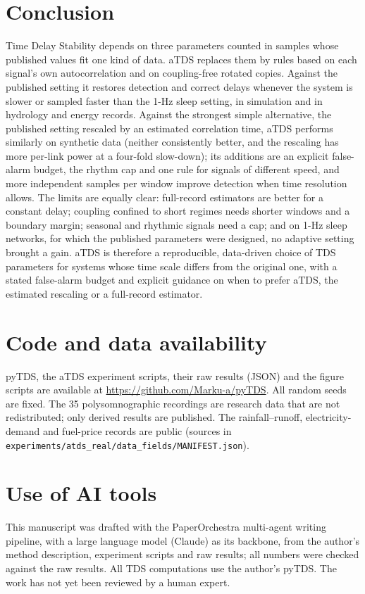 \documentclass[11pt,a4paper]{article}
\begin{document}
\section{Conclusion}
\label{sec:conclusion}
Time Delay Stability depends on three parameters counted in samples whose published values fit one kind of data. aTDS replaces them by rules based on each signal's own autocorrelation and on coupling-free rotated copies. Against the published setting it restores detection and correct delays whenever the system is slower or sampled faster than the 1-Hz sleep setting, in simulation and in hydrology and energy records. Against the strongest simple alternative, the published setting rescaled by an estimated correlation time, aTDS performs similarly on synthetic data (neither consistently better, and the rescaling has more per-link power at a four-fold slow-down); its additions are an explicit false-alarm budget, the rhythm cap and one rule for signals of different speed, and more independent samples per window improve detection when time resolution allows. The limits are equally clear: full-record estimators are better for a constant delay; coupling confined to short regimes needs shorter windows and a boundary margin; seasonal and rhythmic signals need a cap; and on 1-Hz sleep networks, for which the published parameters were designed, no adaptive setting brought a gain. aTDS is therefore a reproducible, data-driven choice of TDS parameters for systems whose time scale differs from the original one, with a stated false-alarm budget and explicit guidance on when to prefer aTDS, the estimated rescaling or a full-record estimator.

\section*{Code and data availability}
pyTDS, the aTDS experiment scripts, their raw results (JSON) and the figure scripts are available at \url{https://github.com/Marku-a/pyTDS}. All random seeds are fixed. The 35 polysomnographic recordings are research data that are not redistributed; only derived results are published. The rainfall--runoff, electricity-demand and fuel-price records are public (sources in \texttt{experiments/atds\_real/data\_fields/MANIFEST.json}).

\section*{Use of AI tools}
This manuscript was drafted with the PaperOrchestra multi-agent writing pipeline, with a large language model (Claude) as its backbone, from the author's method description, experiment scripts and raw results; all numbers were checked against the raw results. All TDS computations use the author's pyTDS. The work has not yet been reviewed by a human expert.
\end{document}
